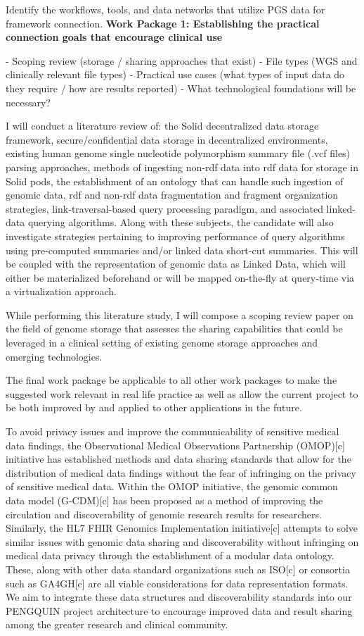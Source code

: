 \documentclass[11pt]{article}
\begin{document}
Identify the workflows, tools, and data networks that utilize PGS data for framework connection.
\textbf{Work Package 1: Establishing the practical connection goals that encourage clinical use}

- Scoping review (storage / sharing approaches that exist)
- File types (WGS and clinically relevant file types)
- Practical use cases (what types of input data do they require / how are results reported)
- What technological foundations will be necessary?

I will conduct a literature review of: the Solid decentralized data storage framework, secure/confidential data storage in decentralized environments, existing human genome single nucleotide polymorphism summary file (.vcf files) parsing approaches, methods of ingesting non-rdf data into rdf data for storage in Solid pods, the establishment of an ontology that can handle such ingestion of genomic data, rdf and non-rdf data fragmentation and fragment organization strategies, link-traversal-based query processing paradigm, and associated linked-data querying algorithms. 
Along with these subjects, the candidate will also investigate strategies pertaining to improving performance of query algorithms using pre-computed summaries and/or linked data short-cut summaries. 
This will be coupled with the representation of genomic data as Linked Data, which will either be materialized beforehand or will be mapped on-the-fly at query-time via a virtualization approach.

While performing this literature study, I will compose a scoping review paper on the field of genome storage that assesses the sharing capabilities that could be leveraged in a clinical setting of existing genome storage approaches and emerging technologies. 

The final work package be applicable to all other work packages to make the suggested work relevant in real life practice as well as allow the current project to be both improved by and applied to other applications in the future.

To avoid privacy issues and improve the communicability of sensitive medical data findings, the Observational Medical Observations Partnership (OMOP)[c] initiative has established methods and data sharing standards that allow for the distribution of medical data findings without the fear of infringing on the privacy of sensitive medical data. 
Within the OMOP initiative, the genomic common data model (G-CDM)[c] has been proposed as a method of improving the circulation and discoverability of genomic research results for researchers. 
Similarly, the HL7 FHIR Genomics Implementation initiative[c] attempts to solve similar issues with genomic data sharing and discoverability without infringing on medical data privacy through the establishment of a modular data ontology. 
These, along with other data standard organizations such as ISO[c] or consortia such as GA4GH[c] are all viable considerations for data representation formats. 
We aim to integrate these data structures and discoverability standards into our PENGQUIN project architecture to encourage improved data and result sharing among the greater research and clinical community. 
\end{document}
